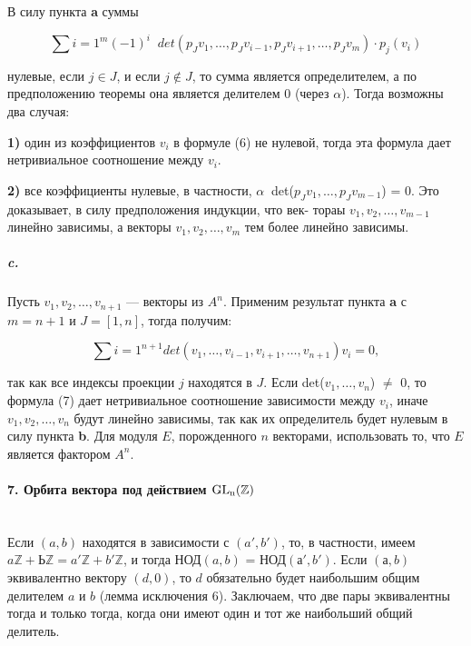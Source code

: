 \documentclass{mai_book}
\begin{document}
{\noindent В силу пункта {\bf a} суммы

\begin{equation*}
\sum\limits {i=1}^m (-1)^i\;\;det(p_{J}v_1,\ldots,p_{J}v_{i-1},p_{J}v_{i+1},\ldots,p_{J}v_{m}) \cdot p_{j}(v_{i})
\end{equation*}

\noindent нулевые, если $j \in J$, и если $j \notin J$, то сумма является определителем, а
по предположению теоремы она является делителем 0 (через $\alpha$). Тогда
возможны два случая:

{\bf 1)} один из коэффициентов $v_{i}$ в формуле (6) не нулевой, тогда эта
формула дает нетривиальное соотношение между $v_{i}$.

{\bf 2)} все коэффициенты нулевые, в частности, $\alpha\;\;$det($p_{J}v_{1},\ldots,p_{J}v_{m-1}$)
= 0. Это доказывает, в силу предположения индукции, что век-
тораы $v_1,v_2,\ldots,v_{m-1}$ линейно зависимы, а векторы $v_1,v_2,\ldots,v_{m}$
тем более линейно зависимы.

\subparagraph{c.} Пусть $v_1,v_2,\ldots,v_{n+1}$ — векторы из $A^{n}$. Применим результат
пункта {\bf a} с $m = n + 1$ и $J = [1,n]$, тогда получим:

\begin{equation}
\sum\limits {i=1}^{n+1} det(v_1,\ldots,v_{i-1},v_{i+1},\ldots,v_{n+1})v_{i} = 0,
\end{equation}




\noindent так как все индексы проекции $j$ находятся в $J$. Если det($v_{1},\ldots,v_{n}$) $\neq$ 0, то формула (7) дает нетривиальное соотношение зависимости между $v_{i}$, иначе $v_1,v_2,\ldots,v_n$ будут линейно зависимы, так как их определитель будет нулевым в силу пункта {\bf b}. Для модуля $E$, порожденного $n$ векторами, использовать то, что $E$ является фактором $A^{n}$.

\paragraph{7. Орбита вектора под действием $\rm{GL_n}(\mathbb {Z})$} \mbox{}\\

Если $(a, b)$ находятся в зависимости с $(a',b')$, то, в частности, имеем $a\mathbb {Z}+ Ь\mathbb {Z} = a'\mathbb {Z}+ b'\mathbb {Z}$, и тогда НОД$(a,b)$ = НОД$(а',b')$. Если $(а, b)$ эквивалентно вектору $(d, 0)$, то $d$ обязательно будет наибольшим общим делителем $a$ и $b$ (лемма исключения 6). Заключаем, что две пары эквивалентны тогда и только тогда, когда они имеют один и тот же наибольший общий делитель.

}
\end{document}
